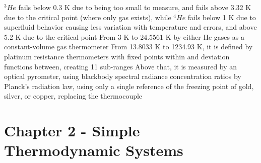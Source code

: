 \documentclass[11 pt, twoside]{article}
\newenvironment{outline*}
{
	\begin{outline}[enumerate]
	}
	{\end{outline}
}
\begin{document}
\begin{outline*}
\3 $^3He$ fails below 0.3 K due to being too small to measure, and fails above 3.32 K due to the critical point (where only gas exists), while $^4He$ fails below 1 K due to superfluid behavior causing less variation with temperature and errors, and above 5.2 K due to the critical point
\2 From 3 K to 24.5561 K by either He gases as a constant-volume gas thermometer
\2 From 13.8033 K to 1234.93 K, it is defined by platinum resistance thermometers with fixed points within and deviation functions between, creating 11 sub-ranges
\2 Above that, it is measured by an optical pyrometer, using blackbody spectral radiance concentration ratios by Planck's radiation law, using only a single reference of the freezing point of gold, silver, or copper, replacing the thermocouple
\end{outline*}
\section{Chapter 2 - Simple Thermodynamic Systems}
\end{document}
